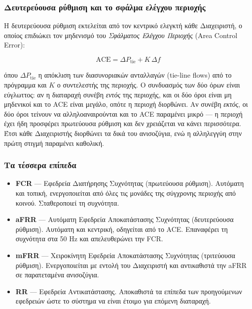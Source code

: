 \subsubsection*{Δευτερεύουσα ρύθμιση και το σφάλμα ελέγχου περιοχής}

Η δευτερεύουσα ρύθμιση εκτελείται από τον κεντρικό ελεγκτή κάθε Διαχειριστή, ο οποίος
επιδιώκει τον μηδενισμό του \emph{Σφάλματος Ελέγχου Περιοχής} (Area Control Error):

\begin{equation}
\mathrm{ACE} = \Delta P_{\mathrm{tie}} + K \, \Delta f
\label{eq:ace}
\end{equation}

όπου $\Delta P_{\mathrm{tie}}$ η απόκλιση των διασυνοριακών ανταλλαγών (tie-line flows) από
το πρόγραμμα και $K$ ο συντελεστής της περιοχής. Ο συνδυασμός των δύο όρων είναι εύγλωττος: αν η
διαταραχή συνέβη \emph{εντός} της περιοχής, και οι δύο όροι είναι μη μηδενικοί και το ACE
είναι μεγάλο, οπότε η περιοχή διορθώνει. Αν συνέβη \emph{εκτός}, οι δύο όροι τείνουν να
αλληλοαναιρούνται και το ACE παραμένει μικρό — η περιοχή έχει ήδη προσφέρει πρωτεύουσα
ρύθμιση και δεν χρειάζεται να κάνει περισσότερα. Έτσι κάθε Διαχειριστής διορθώνει τα δικά
του ανισοζύγια, ενώ η αλληλεγγύη στην πρώτη στιγμή παραμένει καθολική.

\subsubsection*{Τα τέσσερα επίπεδα}

\begin{itemize}
\item \textbf{FCR} --- Εφεδρεία Διατήρησης Συχνότητας (πρωτεύουσα ρύθμιση). Αυτόματη και
      τοπική, ενεργοποιείται από όλες τις μονάδες της σύγχρονης περιοχής από κοινού.
      Σταθεροποιεί τη συχνότητα.
\item \textbf{aFRR} --- Αυτόματη Εφεδρεία Αποκατάστασης Συχνότητας (δευτερεύουσα ρύθμιση).
      Αυτόματη και κεντρική, οδηγείται από το ACE. Επαναφέρει τη συχνότητα στα 50 Hz και
      απελευθερώνει την FCR.
\item \textbf{mFRR} --- Χειροκίνητη Εφεδρεία Αποκατάστασης Συχνότητας (τριτεύουσα ρύθμιση).
      Ενεργοποιείται με εντολή του Διαχειριστή και αντικαθιστά την aFRR σε παρατεταμένα
      ανισοζύγια.
\item \textbf{RR} --- Εφεδρεία Αντικατάστασης. Αποκαθιστά τα επίπεδα των προηγούμενων
      εφεδρειών ώστε το σύστημα να είναι έτοιμο για επόμενη διαταραχή.
\end{itemize}

